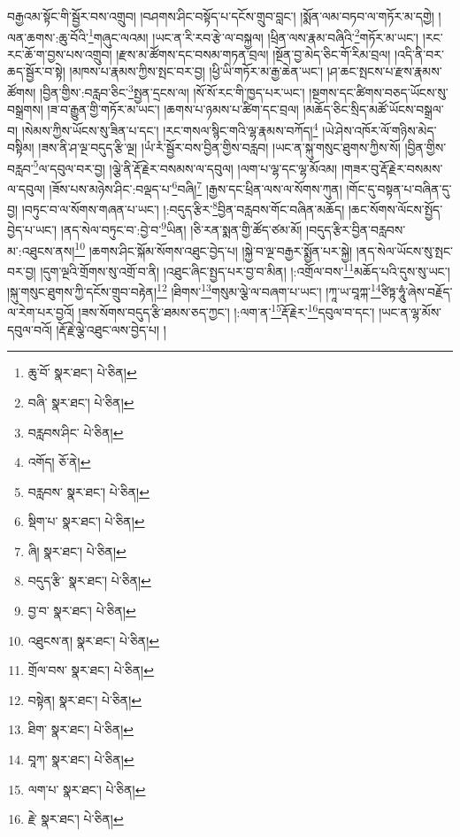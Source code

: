 བརྒྱའམ་སྟོང་གི་སྦྱོར་བས་འགྲུབ། །བཤགས་ཤིང་བསྟོད་པ་དངོས་གྲུབ་བླང་། །སྨོན་ལམ་བཏབ་ལ་གཏོར་མ་དགྱེ། །ལན་ཆགས་:ཆུ་བོའི་\footnote{ཆུ་བོ་  སྣར་ཐང་།  པེ་ཅིན། }གཞུང་ལའམ། །ཡང་ན་རི་རབ་རྩེ་ལ་བསྐྱལ། །ཕྲིན་ལས་རྣམ་བཞིའི་\footnote{བཞི་  སྣར་ཐང་།  པེ་ཅིན། }གཏོར་མ་ཡང་། །རང་རང་ཆོ་ག་བྱས་པས་འགྲུབ། །རྫས་མ་ཚོགས་དང་བསམ་གཏན་བྲལ། །སྔོན་བྱ་མེད་ཅིང་གོ་རིམ་བྲལ། །འདི་ནི་བར་ཆད་སྦྱོར་བ་སྟེ། །མཁས་པ་རྣམས་ཀྱིས་སྤང་བར་བྱ། །ཕྱི་ཡི་གཏོར་མ་རྒྱ་ཆེན་ཡང་། །ཤ་ཆང་སྤངས་པ་རྫས་རྣམས་ཚོགས། །བྱིན་གྱིས་:བརླབ་ཅིང་\footnote{བརླབས་ཤིང་  པེ་ཅིན། }སྤྱན་དྲངས་ལ། །སོ་སོ་རང་གི་ཁྱད་པར་ཡང་། །སྔགས་དང་ཚིགས་བཅད་ཡོངས་སུ་བསྒྲགས། །ཟ་བ་རྒྱུན་གྱི་གཏོར་མ་ཡང་། །ཆགས་པ་ཉམས་པ་ཚིག་དང་བྲལ། །མཆོད་ཅིང་སྲིད་མཚོ་ཡོངས་བསྒྲལ་བ། །སེམས་ཀྱིས་ཡོངས་སུ་ཟིན་པ་དང་། །རང་གསལ་སྙིང་གའི་ལྷ་རྣམས་བཀོད།\footnote{འགོད།  ཅོ་ནེ། } །ཡེ་ཤེས་འཁོར་ལོ་གཉིས་མེད་བསྟིམ། །ཟས་ནི་ཤ་ལྔ་བདུད་རྩི་ལྔ། །ཡཾ་རཾ་སྦྱོར་བས་བྱིན་གྱིས་བརླབ། །ཡང་ན་སྐུ་གསུང་ཐུགས་ཀྱིས་སོ། །བྱིན་གྱིས་བརླབ་\footnote{བརླབས་  སྣར་ཐང་།  པེ་ཅིན། }ལ་དབུལ་བར་བྱ། །ལྕེ་ནི་རྡོ་རྗེར་བསམས་ལ་དབུལ། །ལག་པ་ལྷ་དང་ལྷ་མོའམ། །གཟར་བུ་རྡོ་རྗེར་བསམས་ལ་དབུལ། །ཟོས་པས་མཉེས་ཤིང་:བལྡད་པ་\footnote{སྡིག་པ་  སྣར་ཐང་།  པེ་ཅིན། }བཞི།\footnote{ཞི།  སྣར་ཐང་།  པེ་ཅིན། } །རྒྱས་དང་ཕྲིན་ལས་ལ་སོགས་ཀུན། །གོང་དུ་བསྟན་པ་བཞིན་དུ་བྱ། །བཏུང་བ་ལ་སོགས་གཞན་པ་ཡང་། །:བདུད་རྩིར་\footnote{བདུད་རྩི་  སྣར་ཐང་།  པེ་ཅིན། }བྱིན་བརླབས་གོང་བཞིན་མཆོད། །ཆང་སོགས་ལོངས་སྤྱོད་བྱེད་པ་ཡང་། །ནད་སེལ་བཏུང་བ་:བྱེ་བ་\footnote{བྱ་བ་  སྣར་ཐང་།  པེ་ཅིན། }ཡིན། །ཅི་རན་སྨན་གྱི་ཚོད་ཙམ་མོ། །བདུད་རྩིར་བྱིན་བརླབས་མ་:འཐུངས་ནས།\footnote{འཐུངས་ན།  སྣར་ཐང་།  པེ་ཅིན། } །ཆགས་ཤིང་སྐོམ་སོགས་འཐུང་བྱེད་པ། །སྐྱེ་བ་ལྔ་བརྒྱར་སྨྱོན་པར་སྐྱེ། །ནད་སེལ་ཡོངས་སུ་སྤང་བར་བྱ། །དུག་ལྔའི་གྲོགས་སུ་འགྲོ་བ་ནི། །འཐུང་ཞིང་སྤྱད་པར་བྱ་བ་མིན། །:འགྲོལ་བས་\footnote{གྲོལ་བས་  སྣར་ཐང་།  པེ་ཅིན། }མཆོད་པའི་དུས་སུ་ཡང་། །སྐུ་གསུང་ཐུགས་ཀྱི་དངོས་གྲུབ་བརྟེན།\footnote{བསྟེན།  སྣར་ཐང་།  པེ་ཅིན། } །ཐིགས་\footnote{ཐིག་  སྣར་ཐང་།  པེ་ཅིན། }གསུམ་ལྕེ་ལ་བཞག་པ་ཡང་། །ཀཱ་ཡ་བཱཀྐ་\footnote{བཱཀ་  སྣར་ཐང་།  པེ་ཅིན། }ཙིཏྟ་ཧཱུཾ་ཞེས་བརྗོད་ལ་རེག་པར་བྱའོ། །ཟས་སོགས་བདུད་རྩི་ཐམས་ཅད་ཀྱང་། །:ལག་ན་\footnote{ལག་པ་  སྣར་ཐང་།  པེ་ཅིན། }རྡོ་རྗེར་\footnote{རྗེ་  སྣར་ཐང་།  པེ་ཅིན། }དབུལ་བ་དང་། །ཡང་ན་ལྷ་མོས་དབུལ་བའོ། །རྡོ་རྗེ་ལྕེ་འཐུང་ལས་བྱེད་པ། །
